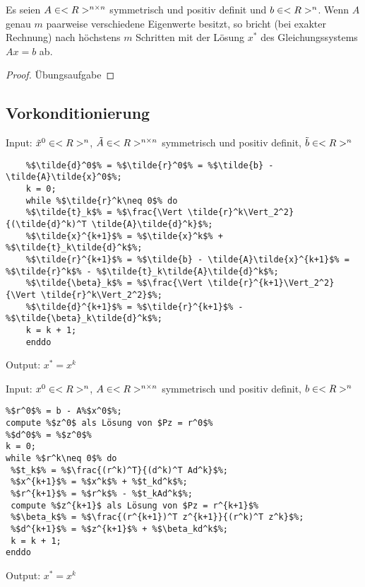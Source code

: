 \begin{proposition}
	Es seien $A\in<R>^{n \times n}$ symmetrisch und positiv definit und $b\in<R>^n$. Wenn $A$ genau $m$ paarweise verschiedene Eigenwerte besitzt, so bricht  (bei exakter Rechnung) nach höchstens $m$ Schritten mit der Lösung $x^\ast$ des Gleichungssystems $Ax=b$ ab.
\end{proposition}
\begin{proof}
	Übungsaufgabe
\end{proof}

\subsection{Vorkonditionierung}

\begin{algorithm}[CG-Verfahren für $\tilde{A}\tilde{x}=\tilde{b}$]
	Input: $\tilde{x}^0\in<R>^n$, $\tilde{A}\in<R>^{n \times n}$ symmetrisch und positiv definit, $\tilde{b}\in<R>^n$
	\begin{lstlisting}
	%$\tilde{d}^0$% = %$\tilde{r}^0$% = %$\tilde{b} - \tilde{A}\tilde{x}^0$%;
	k = 0;
	while %$\tilde{r}^k\neq 0$% do
	%$\tilde{t}_k$% = %$\frac{\Vert \tilde{r}^k\Vert_2^2}{(\tilde{d}^k)^T \tilde{A}\tilde{d}^k}$%;
	%$\tilde{x}^{k+1}$% = %$\tilde{x}^k$% + %$\tilde{t}_k\tilde{d}^k$%;
	%$\tilde{r}^{k+1}$% = %$\tilde{b} - \tilde{A}\tilde{x}^{k+1}$% = %$\tilde{r}^k$% - %$\tilde{t}_k\tilde{A}\tilde{d}^k$%;
	%$\tilde{\beta}_k$% = %$\frac{\Vert \tilde{r}^{k+1}\Vert_2^2}{\Vert \tilde{r}^k\Vert_2^2}$%;
	%$\tilde{d}^{k+1}$% = %$\tilde{r}^{k+1}$% - %$\tilde{\beta}_k\tilde{d}^k$%;
	k = k + 1;
	enddo
	\end{lstlisting}
	Output: $x^\ast=x^k$
\end{algorithm}

\begin{algorithm}
	Input: $x^0\in<R>^n$, $A\in<R>^{n \times n}$ symmetrisch und positiv definit, $b\in<R>^n$
	\begin{lstlisting}
%$r^0$% = b - A%$x^0$%;
compute %$z^0$ als Lösung von $Pz = r^0$% 
%$d^0$% = %$z^0$%
k = 0;
while %$r^k\neq 0$% do
 %$t_k$% = %$\frac{(r^k)^T}{(d^k)^T Ad^k}$%;
 %$x^{k+1}$% = %$x^k$% + %$t_kd^k$%;
 %$r^{k+1}$% = %$r^k$% - %$t_kAd^k$%;
 compute %$z^{k+1}$ als Lösung von $Pz = r^{k+1}$%
 %$\beta_k$% = %$\frac{(r^{k+1})^T z^{k+1}}{(r^k)^T z^k}$%;
 %$d^{k+1}$% = %$z^{k+1}$% + %$\beta_kd^k$%;
 k = k + 1;
enddo
	\end{lstlisting}
	Output: $x^\ast=x^k$
\end{algorithm}


